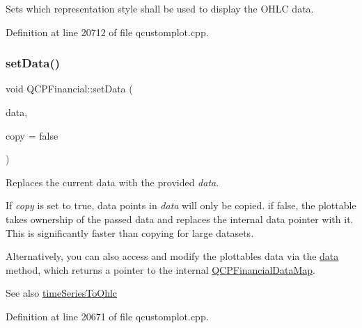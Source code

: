 Sets which representation style shall be used to display the O\+H\+LC data. 

Definition at line 20712 of file qcustomplot.\+cpp.

\mbox{\label{class_q_c_p_financial_adf12a86082f1e488df6a4e8603f8fd6d}} 
\subsubsection{\texorpdfstring{set\+Data()}{setData()}\hspace{0.1cm}{\footnotesize\ttfamily [1/2]}}
{\footnotesize\ttfamily void Q\+C\+P\+Financial\+::set\+Data (\begin{DoxyParamCaption}\item[{\hyperlink{qcustomplot_8h_a745c09823fae0974b50beca9bc3b3d7d}{Q\+C\+P\+Financial\+Data\+Map} $\ast$}]{data,  }\item[{bool}]{copy = {\ttfamily false} }\end{DoxyParamCaption})}

Replaces the current data with the provided {\itshape data}.

If {\itshape copy} is set to true, data points in {\itshape data} will only be copied. if false, the plottable takes ownership of the passed data and replaces the internal data pointer with it. This is significantly faster than copying for large datasets.

Alternatively, you can also access and modify the plottable\textquotesingle{}s data via the \hyperlink{class_q_c_p_financial_a528c81578e4f25999a9169127763cfd4}{data} method, which returns a pointer to the internal \hyperlink{qcustomplot_8h_a745c09823fae0974b50beca9bc3b3d7d}{Q\+C\+P\+Financial\+Data\+Map}.

\begin{DoxySeeAlso}{See also}
\hyperlink{class_q_c_p_financial_a0c3453d1c03e320950fdd2df54e3ebc8}{time\+Series\+To\+Ohlc} 
\end{DoxySeeAlso}


Definition at line 20671 of file qcustomplot.\+cpp.

\mbox{\label{class_q_c_p_financial_a886881339d6447432af55adaad748c3c}} 
